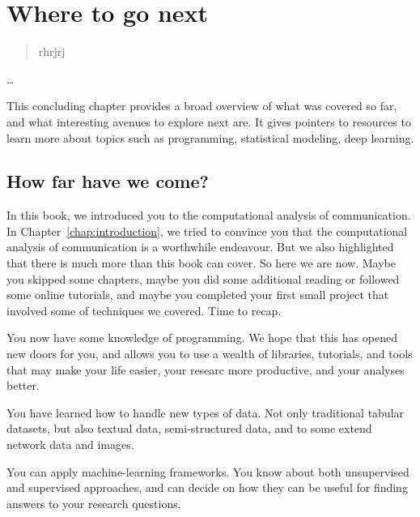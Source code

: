 \chapter{Where to go next}
\label{chap:wherenext}

\begin{abstract}
rhrjrj
\end{abstract}



\begin{objectives}
\item \ldotds
\item \ldots
\end{objectives}

\begin{feature}
This concluding chapter provides a broad overview of what was covered so far, and what interesting avenues to explore next are. It gives pointers to resources to learn more about topics such as programming, statistical modeling, deep learning.

\end{feature}



\section{How far have we come?}
In this book, we introduced you to the computational analysis of communication. In Chapter~\ref{chap:introduction}, we tried to convince you that the computational analysis of communication is a worthwhile endeavour. But we also highlighted that there is much more than this book can cover.
So here we are now. Maybe you skipped some chapters, maybe you did some additional reading or followed some online tutorials, and maybe you completed your first small project that involved some of techniques we covered. Time to recap.

You now have some knowledge of programming. We hope that this has opened new doors for you, and allows you to use a wealth of libraries, tutorials, and tools that may make your life easier, your researc more productive, and your analyses better.

You have learned how to handle new types of data. Not only traditional tabular datasets, but also textual data, semi-structured data, and to some extend network data and images.

You can apply machine-learning frameworks. You know about both unsupervised and supervised approaches, and can decide on how they can be useful for finding answers to your research questions.

